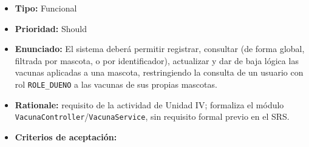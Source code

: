 \documentclass[
  spanish,
]{article}
\providecommand{\tightlist}{%
  \setlength{\itemsep}{0pt}\setlength{\parskip}{0pt}}
\begin{document}
\begin{itemize}
\tightlist
\item
  \textbf{Tipo:} Funcional
\item
  \textbf{Prioridad:} Should
\item
  \textbf{Enunciado:} El sistema deberá permitir registrar, consultar
  (de forma global, filtrada por mascota, o por identificador),
  actualizar y dar de baja lógica las vacunas aplicadas a una mascota,
  restringiendo la consulta de un usuario con rol \texttt{ROLE\_\allowbreak{}DUENO} a
  las vacunas de sus propias mascotas.
\item
  \textbf{Rationale:} requisito de la actividad de Unidad IV; formaliza
  el módulo \texttt{Vacuna\allowbreak{}Controller}/\texttt{Vacuna\allowbreak{}Service}, sin
  requisito formal previo en el SRS.
\item
  \textbf{Criterios de aceptación:}


\end{itemize}
\end{document}
